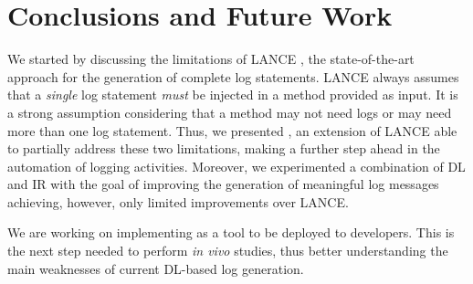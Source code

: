 \section{Conclusions and Future Work} \label{sec:conclusions}

We started by discussing the limitations of LANCE \cite{mastropaolo2022using}, the state-of-the-art approach for the generation of complete log statements. LANCE always assumes that a \emph{single} log statement \emph{must} be injected in a method provided as input. It is a strong assumption considering that a method may not need logs or may need more than one log statement. Thus, we presented \approach, an extension of LANCE able to partially address these two limitations, making a further step ahead in the automation of logging activities. Moreover, we experimented a combination of DL and IR with the goal of improving the generation of meaningful log messages achieving, however, only limited improvements over LANCE. 

We are working on implementing \approach as a tool to be deployed to developers. This is the next step needed to perform \emph{in vivo} studies, thus better understanding the main weaknesses of current DL-based log generation. 